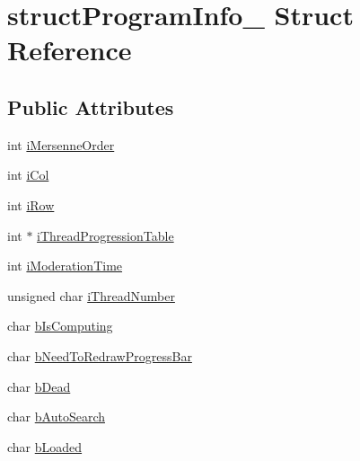 \hypertarget{structstructProgramInfo__}{\section{struct\-Program\-Info\-\_\- Struct Reference}
\label{structstructProgramInfo__}
}
\subsection*{Public Attributes}
\begin{DoxyCompactItemize}
\item 
int \hyperlink{structstructProgramInfo___ad4389f2d8e443aeb9192c279c92fc77b}{i\-Mersenne\-Order}
\item 
int \hyperlink{structstructProgramInfo___a17057266190757980ed9cd6c2b213815}{i\-Col}
\item 
int \hyperlink{structstructProgramInfo___ad25be399a938e3c823f212599c944b38}{i\-Row}
\item 
int $\ast$ \hyperlink{structstructProgramInfo___a29b88009103b7ea74f32a509fab1ac20}{i\-Thread\-Progression\-Table}
\item 
int \hyperlink{structstructProgramInfo___a3a483cd24d5480e5bb013ca804a12157}{i\-Moderation\-Time}
\item 
unsigned char \hyperlink{structstructProgramInfo___aa18bd69e1938ec0d95062bb5090900a0}{i\-Thread\-Number}
\item 
char \hyperlink{structstructProgramInfo___a88655ab266c8154f5f1c472a4894a4ed}{b\-Is\-Computing}
\item 
char \hyperlink{structstructProgramInfo___a06630e04cfe7ef03f3450b8a8b8a8b10}{b\-Need\-To\-Redraw\-Progress\-Bar}
\item 
char \hyperlink{structstructProgramInfo___a9b7de95134debd4325e8a2f7f66bc302}{b\-Dead}
\item 
char \hyperlink{structstructProgramInfo___a21c1f78042caa872eb641ab4fca44927}{b\-Auto\-Search}
\item 
char \hyperlink{structstructProgramInfo___a5af2eea5747632af7dd813fc09c1b13e}{b\-Loaded}
\end{DoxyCompactItemize}


